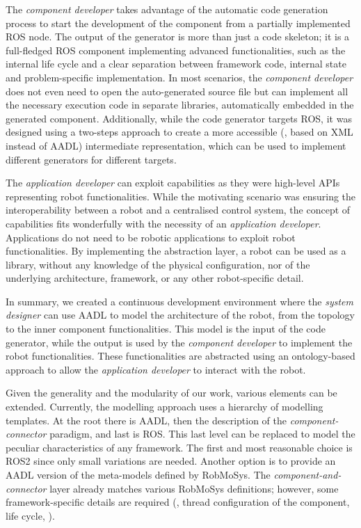 The \textit{component developer} takes advantage of the automatic code generation process to start the development of the component from a partially implemented ROS node. The output of the generator is more than just a code skeleton; it is a full-fledged ROS component implementing advanced functionalities, such as the internal life cycle and a clear separation between framework code, internal state and problem-specific implementation. In most scenarios, the \textit{component developer} does not even need to open the auto-generated source file but can implement all the necessary execution code in separate libraries, automatically embedded in the generated component. Additionally, while the code generator targets ROS, it was designed using a two-steps approach to create a more accessible (\ie, based on XML instead of AADL) intermediate representation, which can be used to implement different generators for different targets.

The \textit{application developer} can exploit capabilities as they were high-level APIs representing robot functionalities. While the motivating scenario was ensuring the interoperability between a robot and a centralised control system, the concept of capabilities fits wonderfully with the necessity of an \textit{application developer}. Applications do not need to be robotic applications to exploit robot functionalities. By implementing the abstraction layer, a robot can be used as a library, without any knowledge of the physical configuration, nor of the underlying architecture, framework, or any other robot-specific detail. 

In summary, we created a continuous development environment where the \textit{system designer} can use AADL to model the architecture of the robot, from the topology to the inner component functionalities. This model is the input of the code generator, while the output is used by the \textit{component developer} to implement the robot functionalities. These functionalities are abstracted using an ontology-based approach to allow the \textit{application developer} to interact with the robot.

Given the generality and the modularity of our work, various elements can be extended. Currently, the modelling approach uses a hierarchy of modelling templates. At the root there is AADL, then the description of the \textit{component-connector} paradigm, and last is ROS. This last level can be replaced to model the peculiar characteristics of any framework. The first and most reasonable choice is ROS2 since only small variations are needed. Another option is to provide an AADL version of the meta-models defined by RobMoSys. The \textit{component-and-connector} layer already matches various RobMoSys definitions; however, some framework-specific details are required (\eg, thread configuration of the component, life cycle, \etc).

